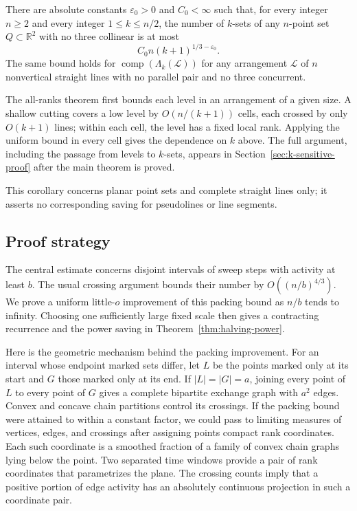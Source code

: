 \begin{corollary}
\label{cor:k-sensitive}
There are absolute constants $\varepsilon_0>0$ and $C_0<\infty$ such
that, for every integer $n\ge2$ and every integer $1\le k\le n/2$,
the number of $k$-sets of any $n$-point set $Q\subset\mathbb R^2$ with
no three collinear is at most
\begin{equation}\label{eq:k-sensitive}
 C_0 n(k+1)^{1/3-\varepsilon_0}.
\end{equation}
The same bound holds for $\operatorname{comp}(\Lambda_k(\mathcal L))$
for any arrangement $\mathcal L$ of $n$ nonvertical straight lines
with no parallel pair and no three concurrent.
\end{corollary}

The all-ranks theorem first bounds each level in an arrangement of a given
size. A shallow cutting covers a low level by $O(n/(k+1))$ cells, each
crossed by only $O(k+1)$ lines; within each cell, the level has a fixed local rank.
Applying the uniform bound in every cell gives the dependence on $k$ above.
The full argument, including the passage from levels to $k$-sets, appears
in Section~\ref{sec:k-sensitive-proof} after the main theorem is proved.

This corollary concerns planar point sets and complete straight lines
only; it asserts no corresponding saving for pseudolines or line segments.

\subsection{Proof strategy}

The central estimate concerns disjoint intervals of sweep steps with
activity at least $b$. The usual crossing argument bounds their number
by $O((n/b)^{4/3})$. We prove a uniform little-$o$ improvement of this
packing bound as $n/b$ tends to infinity. Choosing one sufficiently
large fixed scale then gives a contracting recurrence and the power
saving in Theorem~\ref{thm:halving-power}.

Here is the geometric mechanism behind the packing improvement.
For an interval whose endpoint marked sets differ, let $L$ be the points
marked only at its start and $G$ those marked only at its end. If
$|L|=|G|=a$, joining every point of $L$ to every point of $G$ gives a
complete bipartite exchange graph with $a^2$ edges. Convex and concave chain partitions
control its crossings. If the packing bound were attained to within
a constant factor, we could pass to limiting measures of vertices,
edges, and crossings after assigning points compact rank coordinates.
Each such coordinate is a smoothed fraction of a family of convex
chain graphs lying below the point.
Two separated time windows provide a pair of rank coordinates that
parametrizes the plane. The crossing counts imply that a positive
portion of edge activity has an absolutely continuous projection in
such a coordinate pair.

